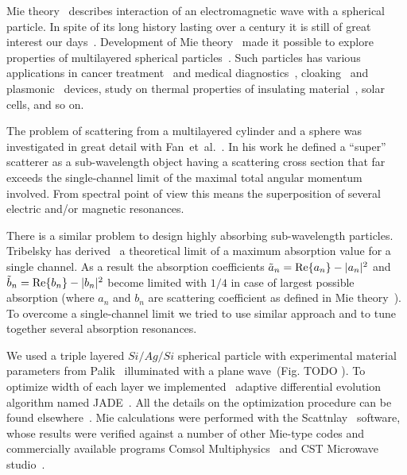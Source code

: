 \documentclass[aps,prl,twocolumn,showpacs,superscriptaddress,groupedaddress]{revtex4-1}
\begin{document}
\maketitle %

Mie theory~\cite{Mie-1908} describes interaction of an electromagnetic
wave with a spherical particle.  In spite of its long history lasting
over a century it is still of great interest our
days~\cite{Suzuki-2008,MacKowski-2012,Lerme-2000,Xu-2005,Li-2006,Gogoi-2010,Santiago-2011}.
Development of Mie theory~\cite{Yang-2003, Pena-scattnlay-2009} made
it possible to explore properties of multilayered spherical
particles~\cite{Sheehan-2013,Selmke-2012}. Such particles has various
applications in cancer treatment~\cite{Zhang-2010, Hirsch-2003} and
medical diagnostics~\cite{Allain-2002},
cloaking~\cite{Qui-2009,Semouchkina-2013, Ladutenko-2014} and
plasmonic~\cite{Martin-2013, Alu-2005} devices, study on thermal
properties of insulating material~\cite{Xie-2013}, solar cells\cite{Kameya-2011,Mann-2011},
and so on.

The problem of scattering from a multilayered cylinder and a sphere
was investigated in great detail with Fan~et~al.~\cite{Fan-2010,Fan-2011}.
In his work he defined a ``super'' scatterer as a sub-wavelength object
having a scattering cross section that far exceeds the single-channel
limit of the maximal total angular momentum involved.  From spectral
point of view this means the superposition of several electric and/or
magnetic resonances.

There is a similar problem to design highly absorbing sub-wavelength
particles.  Tribelsky has derived~\cite{Tribelsky-2011} a theoretical
limit of a maximum absorption value for a single channel.  As a result
the absorption coefficients $\tilde{a}_n= {\rm Re}\{a_n\} - |a_n|^2 $
and $\tilde{b}_n= {\rm Re}\{b_n\} - |b_n|^2 $ become limited with
$1/4$ in case of largest possible absorption (where $a_n$ and $b_n$
are scattering coefficient as defined in Mie
theory~\cite{Bohren-1983}).  To overcome a single-channel limit we
tried to use similar approach and to tune together several absorption
resonances.

We used a triple layered $Si/Ag/Si$ spherical particle with
experimental material parameters from Palik~\cite{palik-1997}
illuminated with a plane wave~(Fig. TODO ).  To optimize width of each
layer we implemented~\cite{JADE-web} adaptive differential
evolution~\cite{Storn-DE-first-1997} algorithm named
JADE~\cite{Jingqiao-JADE-2009}.  All the details on the optimization
procedure can be found elsewhere~\cite{Ladutenko-2014}.  Mie
calculations were performed with the
Scattnlay~\cite{Pena-scattnlay-2009,Scattnlay-web} software, whose results were
verified against a number of other Mie-type codes and commercially
available programs Comsol Multiphysics~\cite{Comsol-web} and CST Microwave
studio~\cite{CST-web}.
\end{document}
